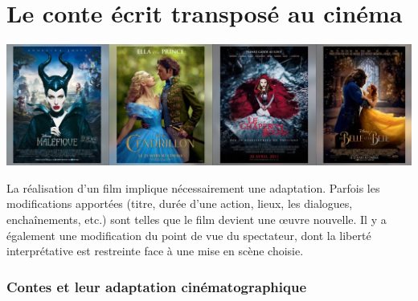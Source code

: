 \documentclass[
  10pt,
  french,
  a5paper,
  openany]{book}
\begin{document}

\renewcommand{\chaptermark}[1]{\markboth{\footnotesize\space#1}{}}
\pagestyle{themes}

\hypertarget{le-conte-uxe9crit-transposuxe9-au-cinuxe9ma}{%
\chapter{Le conte écrit transposé au cinéma}\label{le-conte-uxe9crit-transposuxe9-au-cinuxe9ma}}

\begin{center}
\includegraphics[width=1\textwidth,height=\textheight]{images/le-conte-ecrit-transpose-au-cinema.jpg}

\end{center}

La réalisation d'un film implique nécessairement une adaptation. Parfois les modifications apportées (titre, durée d'une action, lieux, les dialogues, enchaînements, etc.) sont telles que le film devient une œuvre nouvelle.
Il y a également une modification du point de vue du spectateur, dont la liberté interprétative est restreinte face à une mise en scène choisie.

\hypertarget{contes-et-leur-adaptation-cinuxe9matographique}{%
\subsection*{Contes et leur adaptation cinématographique}\label{contes-et-leur-adaptation-cinuxe9matographique}}
\end{document}
